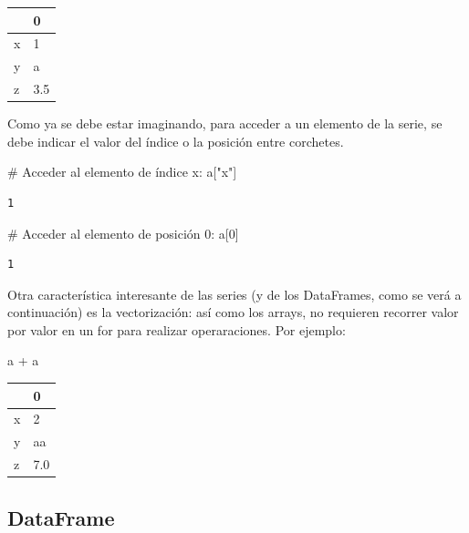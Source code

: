 \documentclass[
  letterpaper,
  DIV=11,
  numbers=noendperiod]{scrreprt}
\newenvironment{Shaded}{\begin{snugshade}}{\end{snugshade}}
\newcommand{\CommentTok}[1]{\textcolor[rgb]{0.37,0.37,0.37}{#1}}
\newcommand{\DecValTok}[1]{\textcolor[rgb]{0.68,0.00,0.00}{#1}}
\newcommand{\NormalTok}[1]{\textcolor[rgb]{0.00,0.23,0.31}{#1}}
\newcommand{\OperatorTok}[1]{\textcolor[rgb]{0.37,0.37,0.37}{#1}}
\newcommand{\StringTok}[1]{\textcolor[rgb]{0.13,0.47,0.30}{#1}}
\begin{document}
\begin{tabular}{ll}
\toprule
{} &    0 \\
\midrule
x &    1 \\
y &    a \\
z &  3.5 \\
\bottomrule
\end{tabular}

Como ya se debe estar imaginando, para acceder a un elemento de la
serie, se debe indicar el valor del índice o la posición entre
corchetes.

\begin{Shaded}
\begin{Highlighting}[]
\CommentTok{\# Acceder al elemento de índice x:}
\NormalTok{a[}\StringTok{"x"}\NormalTok{]}
\end{Highlighting}
\end{Shaded}

\begin{verbatim}
1
\end{verbatim}

\begin{Shaded}
\begin{Highlighting}[]
\CommentTok{\# Acceder al elemento de posición 0:}
\NormalTok{a[}\DecValTok{0}\NormalTok{]}
\end{Highlighting}
\end{Shaded}

\begin{verbatim}
1
\end{verbatim}

Otra característica interesante de las series (y de los DataFrames, como
se verá a continuación) es la vectorización: así como los arrays, no
requieren recorrer valor por valor en un for para realizar
operaraciones. Por ejemplo:

\begin{Shaded}
\begin{Highlighting}[]
\NormalTok{a }\OperatorTok{+}\NormalTok{ a}
\end{Highlighting}
\end{Shaded}

\begin{tabular}{ll}
\toprule
{} &    0 \\
\midrule
x &    2 \\
y &   aa \\
z &  7.0 \\
\bottomrule
\end{tabular}

\subsection{\texorpdfstring{\textbf{DataFrame}}{DataFrame}}\label{dataframe}
\end{document}
